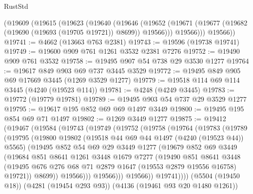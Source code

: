 \begin{lexlean}{RustStd}
\begin{coremodule}
    (@19609
      (@19615
        (@19623
          (@19640
            (@19646
              (@19652 (@19671 (@19677 (@19682 (@19690 (@19693 (@19705 @19721)) @8699)) @19566)))
              @19566)))
        @19566))
@19741 := @4662 (@13663 @763 @2381)
@19743 := @19596 (@19738 @19741)
@19749 := @19600 @909 @761 @1261 @3532 @2381 @7276
@19752 := @19490 @909 @761 @3532
@19758 := @19495 @907 @54 @738 @29 @3530 @1277
@19764 := @19617 @849 @903 @69 @737 @3445 @3529
@19772 := @19495 @849 @905 @69 @17669 @3445 (@1269 @3529 @1277)
@19779 := @19518 @114 @69 @114 @3445 (@4240 (@19523 @114))
@19781 := @4248 (@4249 @3445)
@19783 := @19772 (@19779 @19781)
@19789 := @19495 @903 @54 @737 @29 @3529 @1277
@19795 := @19617 @195 @852 @69 @69 @1497 @3449
@19800 := @19495 @195 @854 @69 @71 @1497
@19802 := @1269 @3449 @1277
@19875 := @19412
    (@19467
      (@19584
        (@19743
          (@19749
            (@19752
              (@19758
                (@19764
                  (@19783
                    (@19789
                      (@19795
                        (@19800
                          @19802
                          (@19518 @44 @69 @44 @1497 (@4240 (@19523 @44)) @5565)
                          (@19495
                            @852
                            @54
                            @69
                            @29
                            @3449
                            @1277
                            (@19679
                              @852
                              @69
                              @3449
                              (@19684
                                @851
                                @8641
                                @1261
                                @3448
                                @1679
                                @7277
                                (@19490
                                  @851
                                  @8641
                                  @3448
                                  (@19495
                                    @676
                                    @276
                                    @68
                                    @71
                                    @2879
                                    @1647
                                    (@19553 @2879 @19556 @16758)
                                    @19721))
                                @8699))
                            @19566)))
                      @19566)))
                @19566))
            @19741))))
    (@5504 (@19450 @18))
    (@4281 (@19454 @293 @93))
    (@4136 (@19461 @93 @20 @1480 @1261))

\end{coremodule}
\end{lexlean}
